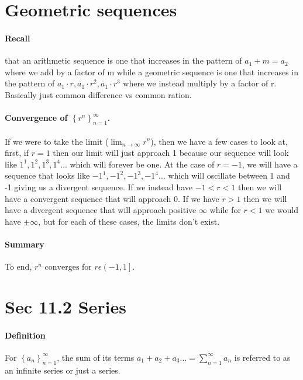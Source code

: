 \documentclass[a4paper]{article}
\begin{document}
\section{Geometric sequences}%
\label{sec:Geometric sequences}
\paragraph{Recall}
that an arithmetic sequence is one that increases in the pattern of $ a_1 + m = a_2 $ where we add by a factor of m while a geometric sequence is one that increases in the pattern of $ a_1 \cdot r, a_1 \cdot r^2, a_1 \cdot r^{ 3 }$ where we instead multiply by a factor of r. Basically just common difference vs common ration. 

\paragraph{Convergence of $ \left\{ r^{ n } \right\}_{ n=1 }^{ \infty }  $.}
If we were to take the limit ($ \lim_{ n \to \infty} r^{ n }$), then we have a few cases to look at, first, if $ r=1 $ then our limit will just approach 1 because our sequence will look like $ 1^{ 1 }, 1^{ 2 },1^{ 3 },1^{ 4 }\ldots $ which will forever be one. At the case of $ r=-1 $, we will have a sequence that looks like $ -1^{ 1 }, -1^{ 2 }, -1^{ 3 }, -1^{ 4 }\ldots $ which will oscillate between 1 and -1 giving us a divergent sequence. If we instead have $ -1<r<1 $ then we will have a convergent sequence that will approach 0. If we have $ r>1 $ then we will have a divergent sequence that will approach positive $ \infty $ while for $ r<1 $ we would have $ \pm \infty $, but for each of these cases, the limits don't exist. 

\paragraph{Summary}
To end, $ r^{ n } \text{ converges for } r\epsilon\left( -1,1 \right] $.

\section{Sec 11.2 Series}%
\label{sec:Sec 11.2 Series}

\paragraph{Definition\\}
For $ \left\{ a_n \right\} ^{ \infty }_{ n=1 } $, the sum of its terms $ a_1 + a_2 + a_3 \ldots = \sum_{ n=1 } ^{ \infty } a_n$ is referred to as an infinite series or just a series. \\
\end{document}
